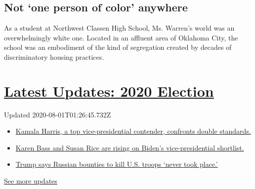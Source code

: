 \hypertarget{not-one-person-of-color-anywhere}{%
\subsection{Not `one person of color'
anywhere}\label{not-one-person-of-color-anywhere}}

As a student at Northwest Classen High School, Ms. Warren's world was an
overwhelmingly white one. Located in an affluent area of Oklahoma City,
the school was an embodiment of the kind of segregation created by
decades of discriminatory housing practices.

\hypertarget{latest-updates-2020-election}{%
\section{\texorpdfstring{\href{https://www.nytimes3xbfgragh.onion/2020/07/31/us/elections/biden-vs-trump.html?action=click\&pgtype=Article\&state=default\&region=MAIN_CONTENT_1\&context=storylines_live_updates}{Latest
Updates: 2020
Election}}{Latest Updates: 2020 Election}}\label{latest-updates-2020-election}}

Updated 2020-08-01T01:26:45.732Z

\begin{itemize}
\tightlist
\item
  \href{https://www.nytimes3xbfgragh.onion/2020/07/31/us/elections/biden-vs-trump.html?action=click\&pgtype=Article\&state=default\&region=MAIN_CONTENT_1\&context=storylines_live_updates\#link-29fdff45}{Kamala
  Harris, a top vice-presidential contender, confronts double
  standards.}
\item
  \href{https://www.nytimes3xbfgragh.onion/2020/07/31/us/elections/biden-vs-trump.html?action=click\&pgtype=Article\&state=default\&region=MAIN_CONTENT_1\&context=storylines_live_updates\#link-13ec3d9c}{Karen
  Bass and Susan Rice are rising on Biden's vice-presidential
  shortlist.}
\item
  \href{https://www.nytimes3xbfgragh.onion/2020/07/31/us/elections/biden-vs-trump.html?action=click\&pgtype=Article\&state=default\&region=MAIN_CONTENT_1\&context=storylines_live_updates\#link-49e9a016}{Trump
  says Russian bounties to kill U.S. troops `never took place.'}
\end{itemize}

\href{https://www.nytimes3xbfgragh.onion/2020/07/31/us/elections/biden-vs-trump.html?action=click\&pgtype=Article\&state=default\&region=MAIN_CONTENT_1\&context=storylines_live_updates}{See
more updates}

